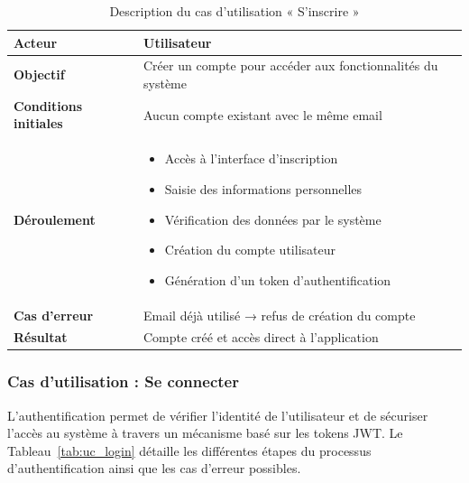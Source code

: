 \begin{table}[H]
\centering
\renewcommand{\arraystretch}{1.2}
\begin{tabular}{|p{4cm}|p{10cm}|}
\hline
\textbf{Acteur} & Utilisateur \\ \hline

\textbf{Objectif} & Créer un compte pour accéder aux fonctionnalités du système \\ \hline

\textbf{Conditions initiales} & Aucun compte existant avec le même email \\ \hline

\textbf{Déroulement} & 
\begin{itemize}
    \item Accès à l’interface d’inscription
    \item Saisie des informations personnelles
    \item Vérification des données par le système
    \item Création du compte utilisateur
    \item Génération d’un token d’authentification
\end{itemize} \\ \hline

\textbf{Cas d’erreur} & Email déjà utilisé → refus de création du compte \\ \hline

\textbf{Résultat} & Compte créé et accès direct à l’application \\ \hline
\end{tabular}
\caption{Description du cas d’utilisation « S’inscrire »}
\label{tab:uc_register}
\end{table}

\subsubsection{Cas d’utilisation : Se connecter}

L’authentification permet de vérifier l’identité de l’utilisateur et de sécuriser l’accès au système à travers un mécanisme basé sur les tokens JWT. Le Tableau~\ref{tab:uc_login} détaille les différentes étapes du processus d’authentification ainsi que les cas d’erreur possibles.

